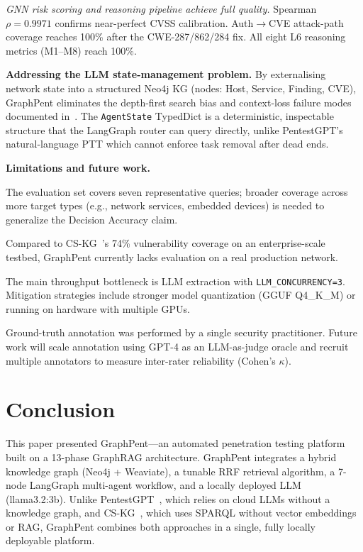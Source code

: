 \documentclass[conference]{IEEEtran}
\begin{document}
\emph{GNN risk scoring and reasoning pipeline achieve full quality.}
Spearman $\rho = 0.9971$ confirms near-perfect CVSS calibration.
Auth$\to$CVE attack-path coverage reaches 100\% after the CWE-287/862/284 fix.
All eight L6 reasoning metrics (M1--M8) reach 100\%.

\textbf{Addressing the LLM state-management problem.}
By externalising network state into a structured Neo4j KG (nodes: Host, Service,
Finding, CVE), GraphPent eliminates the depth-first search bias and context-loss
failure modes documented in~\cite{autopenbench2024,llmbench2024}.
The \texttt{AgentState} TypedDict is a deterministic, inspectable structure
that the LangGraph router can query directly, unlike PentestGPT's natural-language PTT
which cannot enforce task removal after dead ends.

\textbf{Limitations and future work.}

The evaluation set covers seven representative queries; broader coverage across
more target types (e.g., network services, embedded devices) is needed to
generalize the Decision Accuracy claim.

Compared to CS-KG~\cite{pan2025cskg}'s 74\% vulnerability coverage on an
enterprise-scale testbed, GraphPent currently lacks evaluation on a real
production network.

The main throughput bottleneck is LLM extraction with
\texttt{LLM\_CONCURRENCY=3}.
Mitigation strategies include stronger model quantization (GGUF Q4\_K\_M) or
running on hardware with multiple GPUs.

Ground-truth annotation was performed by a single security practitioner.
Future work will scale annotation using GPT-4 as an LLM-as-judge oracle and
recruit multiple annotators to measure inter-rater reliability (Cohen's $\kappa$).

\section{Conclusion}

This paper presented GraphPent—an automated penetration testing platform built
on a 13-phase GraphRAG architecture.
GraphPent integrates a hybrid knowledge graph (Neo4j + Weaviate), a tunable
RRF retrieval algorithm, a 7-node LangGraph multi-agent workflow, and a locally
deployed LLM (llama3.2:3b).
Unlike PentestGPT~\cite{deng2024pentestgpt}, which relies on cloud LLMs without
a knowledge graph, and CS-KG~\cite{pan2025cskg}, which uses SPARQL without
vector embeddings or RAG, GraphPent combines both approaches in a single,
fully locally deployable platform.
\end{document}
